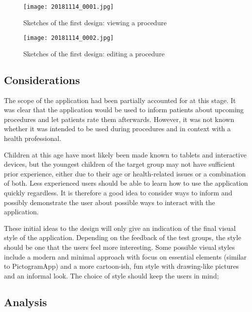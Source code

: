 \begin{sidewaysfigure}
    \centering
    \texttt{[image: 20181114\_0001.jpg]}
    \caption{Sketches of the first design: viewing a procedure}
    \label{fig:sketch-viewprocedure}
\end{sidewaysfigure}

\begin{sidewaysfigure}
    \centering
    \texttt{[image: 20181114\_0002.jpg]}
    \caption{Sketches of the first design: editing a procedure}
    \label{fig:sketch-editprocedure}
\end{sidewaysfigure}

\subsection{Considerations}

The scope of the application had been partially accounted for at this stage. It was clear that the application would be used to inform patients about upcoming procedures and let patients rate them afterwards. However, it was not known whether it was intended to be used during procedures and in context with a health professional.

Children at this age have most likely been made known to tablets and interactive devices, but the youngest children of the target group may not have sufficient prior experience, either due to their age or health-related issues or a combination of both. Less experienced users should be able to learn how to use the application quickly regardless. It is therefore a good idea to consider ways to inform and possibly demonstrate the user about possible ways to interact with the application.

These initial ideas to the design will only give an indication of the final visual style of the application. Depending on the feedback of the test groups, the style should be one that the users feel more interesting. Some possible visual styles include a modern and minimal approach with focus on essential elements (similar to PictogramApp) and a more cartoon-ish, fun style with drawing-like pictures and an informal look. The choice of style should keep the users in mind; 

\subsection{Analysis}

